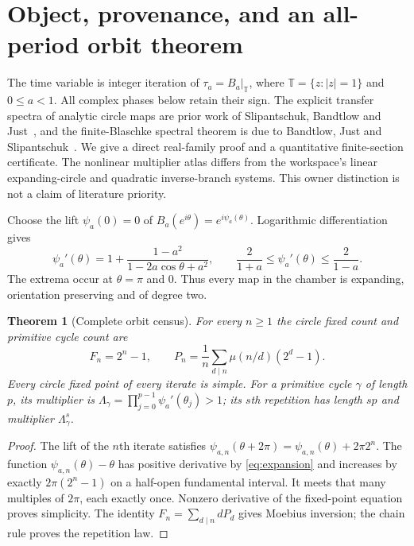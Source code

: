 \documentclass[10pt]{article}
\newtheorem{theorem}{Theorem}
\newcommand{\TT}{\mathbb T}
\begin{document}
\section{Object, provenance, and an all-period orbit theorem}

The time variable is integer iteration of $\tau_a=B_a|_{\TT}$, where
$\TT=\{z:|z|=1\}$ and $0\leq a<1$. All complex phases below retain their
sign. The explicit transfer spectra of analytic circle maps are prior work
of Slipantschuk, Bandtlow and Just~\cite{explicit}, and the finite-Blaschke
spectral theorem is due to Bandtlow, Just and Slipantschuk~\cite{BJS}.
We give a direct real-family proof and a quantitative finite-section
certificate. The nonlinear multiplier atlas differs from the workspace's
linear expanding-circle and quadratic inverse-branch systems. This owner
distinction is not a claim of literature priority.

Choose the lift $\psi_a(0)=0$ of $B_a(e^{i\theta})=e^{i\psi_a(\theta)}$.
Logarithmic differentiation gives
\begin{equation}
 \psi_a'(\theta)=1+\frac{1-a^2}{1-2a\cos\theta+a^2},\qquad
 \frac2{1+a}\leq\psi_a'(\theta)\leq\frac2{1-a}. \label{eq:expansion}
\end{equation}
The extrema occur at $\theta=\pi$ and $0$. Thus every map in the chamber
is expanding, orientation preserving and of degree two.

\begin{theorem}[Complete orbit census]
For every $n\geq1$ the circle fixed count and primitive cycle count are
\begin{equation}
 F_n=2^n-1,\qquad
 P_n=\frac1n\sum_{d\mid n}\mu(n/d)(2^d-1). \label{eq:census}
\end{equation}
Every circle fixed point of every iterate is simple. For a primitive cycle
$\gamma$ of length $p$, its multiplier is
$\Lambda_\gamma=\prod_{j=0}^{p-1}\psi_a'(\theta_j)>1$; its $s$th
repetition has length $sp$ and multiplier $\Lambda_\gamma^s$.
\end{theorem}
\begin{proof}
The lift of the $n$th iterate satisfies
$\psi_{a,n}(\theta+2\pi)=\psi_{a,n}(\theta)+2\pi2^n$.
The function $\psi_{a,n}(\theta)-\theta$ has positive derivative by
\eqref{eq:expansion} and increases by exactly $2\pi(2^n-1)$ on a
half-open fundamental interval. It meets that many multiples of $2\pi$,
each exactly once. Nonzero derivative of the fixed-point equation proves
simplicity. The identity $F_n=\sum_{d\mid n}dP_d$ gives Moebius inversion;
the chain rule proves the repetition law.
\end{proof}
\end{document}
